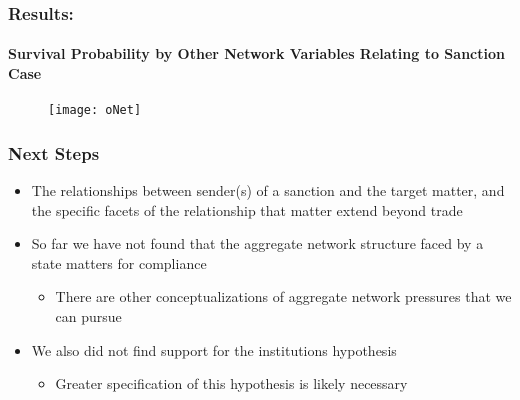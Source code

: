 \begin{frame}
\frametitle{Results:}	
\framesubtitle{Survival Probability by Other Network Variables Relating to Sanction Case}

\begin{figure}[ht]
	\centering
	\texttt{[image: oNet]}
\end{figure}

\end{frame}

\begin{frame}
\frametitle{Next Steps}

\begin{itemize}
	\item The relationships between sender(s) of a sanction and the target matter, and the specific facets of the relationship that matter extend beyond trade
	\item So far we have not found that the aggregate network structure faced by a state matters for compliance
	\begin{itemize}
		\item There are other conceptualizations of aggregate network pressures that we can pursue
	\end{itemize}
	\item We also did not find support for the institutions hypothesis
	\begin{itemize}
		\item Greater specification of this hypothesis is likely necessary
	\end{itemize}
\end{itemize}
\end{frame}
